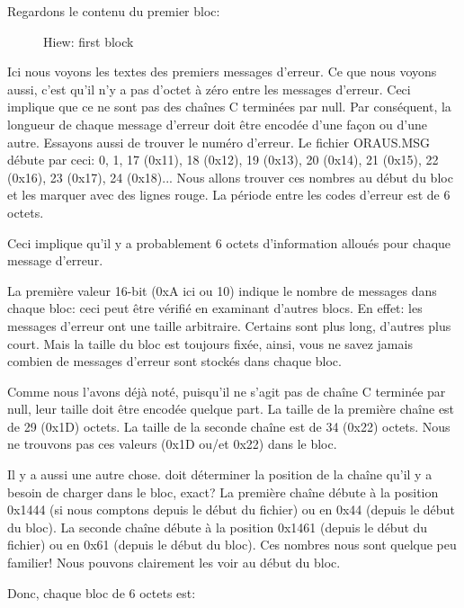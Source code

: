 \clearpage
Regardons le contenu du premier bloc:

\begin{figure}[H]
\centering
{}
\caption{Hiew: first block}
\label{fig:oracle_MSB_2}
\end{figure}

Ici nous voyons les textes des premiers messages d'erreur.
Ce que nous voyons aussi, c'est qu'il n'y a pas d'octet à zéro entre les messages d'erreur.
Ceci implique que ce ne sont pas des chaînes C terminées par null.
Par conséquent, la longueur de chaque message d'erreur doit être encodée
d'une façon ou d'une autre.
Essayons aussi de trouver le numéro d'erreur.
Le fichier ORAUS.MSG débute par ceci:
0, 1, 17 (0x11), 18 (0x12), 19 (0x13), 20 (0x14), 21 (0x15), 22 (0x16), 23 (0x17), 24 (0x18)...
Nous allons trouver ces nombres au début du bloc et les marquer avec des lignes
rouge.
La période entre les codes d'erreur est de 6 octets.

Ceci implique qu'il y a probablement 6 octets d'information alloués pour chaque
message d'erreur.

La première valeur 16-bit (0xA ici ou 10) indique le nombre de messages dans chaque
bloc: ceci peut être vérifié en examinant d'autres blocs.
En effet: les messages d'erreur ont une taille arbitraire.
Certains sont plus long, d'autres plus court.
Mais la taille du bloc est toujours fixée, ainsi, vous ne savez jamais combien
de messages d'erreur sont stockés dans chaque bloc.

Comme nous l'avons déjà noté, puisqu'il ne s'agit pas de chaîne C terminée par null,
leur taille doit être encodée quelque part.
La taille de la première chaîne  est de 29
(0x1D) octets.
La taille de la seconde chaîne  est de 34
(0x22) octets.
Nous ne trouvons pas ces valeurs (0x1D ou/et 0x22) dans le bloc.%

Il y a aussi une autre chose.
\oracle 
doit déterminer la position de la chaîne qu'il y a besoin de charger dans le bloc, exact?
La première chaîne  débute à la position 0x1444
(si nous comptons depuis le début du fichier) ou en 0x44 (depuis le début du bloc).
La seconde chaîne  débute à la position
0x1461 (depuis le début du fichier) ou en 0x61 (depuis le début du bloc).
Ces nombres nous sont quelque peu familier!
Nous pouvons clairement les voir au début du bloc.

Donc, chaque bloc de 6 octets est:

